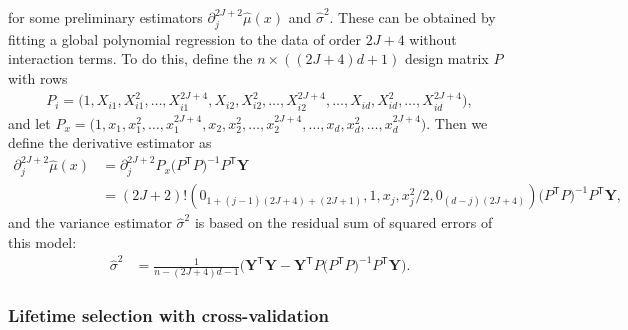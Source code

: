 \documentclass[11pt,lof]{puthesis}
\newcommand{\bY}{\ensuremath{\mathbf{Y}}}
\newcommand{\T}{\ensuremath{\mathsf{T}}}
\theoremstyle{break}
\theoremstyle{proof}
\begin{document}
%
for some preliminary estimators
$\partial^{2 J + 2}_j \hat\mu(x)$ and $\hat\sigma^2$.
These can be obtained by fitting a global polynomial regression
to the data of order $2 J + 4$ without interaction terms.
To do this, define the $n \times ((2 J + 4)d + 1)$ design matrix $P$ with rows
%
\begin{align*}
  P_i = \big(
    1, X_{i1}, X_{i1}^2, \ldots, X_{i1}^{2 J + 4},
    X_{i2}, X_{i2}^2, \ldots, X_{i2}^{2 J + 4},
    \ldots,
    X_{id}, X_{id}^2, \ldots, X_{id}^{2 J + 4}
  \big),
\end{align*}
%
and let
%
$P_x = \big(
  1, x_{1}, x_{1}^2, \ldots, x_{1}^{2 J + 4},
  x_{2}, x_{2}^2, \ldots, x_{2}^{2 J + 4},
  \ldots,
  x_{d}, x_{d}^2, \ldots, x_{d}^{2 J + 4}
\big).
$
%
Then we define the derivative estimator as
%
\begin{align*}
  \partial^{2 J + 2}_j \hat\mu(x)
  &=
  \partial^{2 J + 2}_j P_x
  \big( P^\T P \big)^{-1}
  P^\T \bY \\
  &=
  (2J + 2)!
  \left(
    0_{1 + (j-1)(2 J + 4) + (2J + 1)},
    1, x_j, x_j^2 / 2,
    0_{(d-j)(2 J + 4)}
  \right)
  \big( P^\T P \big)^{-1}
  P^\T \bY,
\end{align*}
%
and the variance estimator $\hat\sigma^2$ is
based on the residual sum of squared errors of this model:
%
\begin{align*}
  \hat\sigma^2
  &=
  \frac{1}{n - (2J + 4)d - 1}
  \big(
    \bY^\T \bY
    - \bY^\T P \big( P^\T P \big)^{-1} P^\T \bY
  \big).
\end{align*}

\subsubsection*{Lifetime selection with cross-validation}
\end{document}

